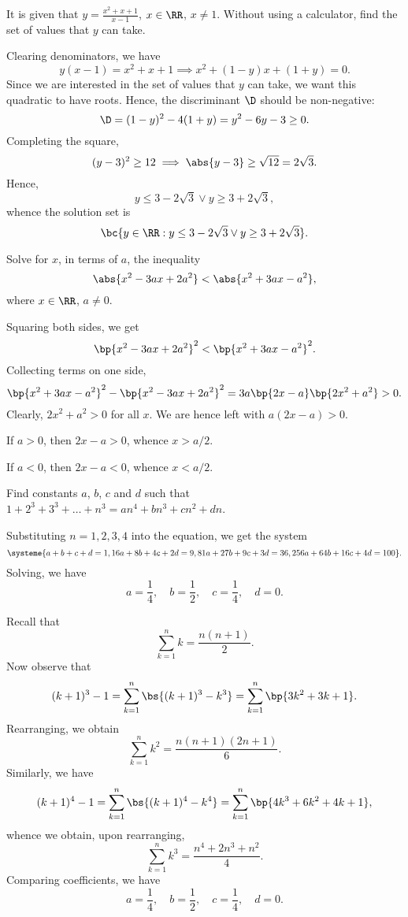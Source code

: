 \begin{problem}
    It is given that $y = \frac{x^2 + x + 1}{x - 1}$, $x \in \RR$, $x \neq 1$. Without using a calculator, find the set of values that $y$ can take.
\end{problem}
\begin{solution}
    Clearing denominators, we have \[y(x-1) = x^2 + x + 1 \implies x^2 + (1-y)x + (1+y) = 0.\] Since we are interested in the set of values that $y$ can take, we want this quadratic to have roots. Hence, the discriminant $\D$ should be non-negative: \[\D = (1-y)^2 - 4(1 + y) = y^2 - 6y - 3 \geq 0.\] Completing the square, \[(y-3)^2 \geq 12 \implies \abs{y - 3} \geq \sqrt{12} = 2\sqrt3.\] Hence, \[y \leq 3 - 2\sqrt3 \lor y \geq 3 + 2\sqrt3,\] whence the solution set is \[\bc{y \in \RR: y \leq 3 - 2\sqrt3 \lor y \geq 3 + 2\sqrt3}.\]
\end{solution}

\begin{problem}[\chili]
    Solve for $x$, in terms of $a$, the inequality \[\abs{x^2 - 3ax + 2a^2} < \abs{x^2 + 3ax - a^2},\] where $x \in \RR$, $a \neq 0$.
\end{problem}
\begin{solution}
    Squaring both sides, we get \[\bp{x^2 - 3ax + 2a^2}^2 < \bp{x^2 + 3ax - a^2}^2.\] Collecting terms on one side, \[\bp{x^2 + 3ax - a^2}^2 - \bp{x^2 - 3ax + 2a^2}^2 = 3a\bp{2x - a}\bp{2x^2 + a^2} > 0.\] Clearly, $2x^2 + a^2 > 0$ for all $x$. We are hence left with $a(2x - a) > 0$.

     If $a > 0$, then $2x - a > 0$, whence $x > a/2$.

     If $a < 0$, then $2x - a < 0$, whence $x < a/2$.
\end{solution}

\begin{problem}[\chili]
    Find constants $a$, $b$, $c$ and $d$ such that $1 + 2^3 + 3^3 + \dots + n^3 = an^4 + bn^3 + cn^2 + dn$.
\end{problem}
\begin{solution}[1]
    Substituting $n = 1, 2, 3, 4$ into the equation, we get the system \[\systeme{a + b + c + d = 1, 16a + 8b + 4c + 2d = 9, 81a + 27b + 9c + 3d = 36, 256a + 64b + 16c + 4d = 100}.\] Solving, we have \[a = \frac14, \quad b = \frac12, \quad c = \frac14, \quad d = 0.\]
\end{solution}
\begin{solution}[2]
    Recall that \[\sum_{k = 1}^n k = \frac{n(n+1)}{2}.\] Now observe that \[(k+1)^3 - 1 = \sum_{k = 1}^n \bs{(k+1)^3 - k^3} = \sum_{k = 1}^n \bp{3k^2 + 3k + 1}.\] Rearranging, we obtain \[\sum_{k = 1}^n k^2 = \frac{n(n+1)(2n+1)}6.\] Similarly, we have \[(k+1)^4 - 1 = \sum_{k = 1}^n \bs{(k+1)^4 - k^4} = \sum_{k = 1}^n \bp{4k^3 + 6k^2 + 4k + 1},\] whence we obtain, upon rearranging, \[\sum_{k = 1}^n k^3 = \frac{n^4 + 2n^3 + n^2}{4}.\] Comparing coefficients, we have \[a = \frac14, \quad b = \frac12, \quad c = \frac14, \quad d = 0.\]
\end{solution}

